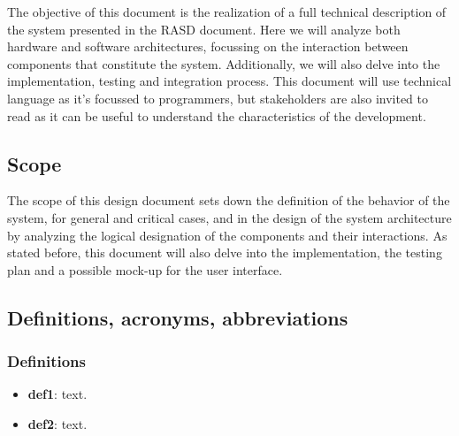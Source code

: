 \documentclass[table, 12pt]{article}
\begin{document}
The objective of this document is the realization of a full technical description of the system presented in the RASD document.
Here we will analyze both hardware and software architectures, focussing on the interaction between components that constitute the system.
Additionally, we will also delve into the implementation, testing and integration process.
This document will use technical language as it's focussed to programmers, but stakeholders are also invited to read as it can be useful to understand the characteristics of the development.

\subsection{Scope}

The scope of this design document sets down the definition of the behavior of the system, for general and critical cases, and in the design of the system architecture by analyzing the logical designation of the components and their interactions.
As stated before, this document will also delve into the implementation, the testing plan and a possible mock-up for the user interface.

\subsection{Definitions, acronyms, abbreviations}
\subsubsection*{Definitions}
\begin{itemize}
    \item \textbf{def1}: text.
    \item \textbf{def2}: text.
\end{itemize}
\end{document}
